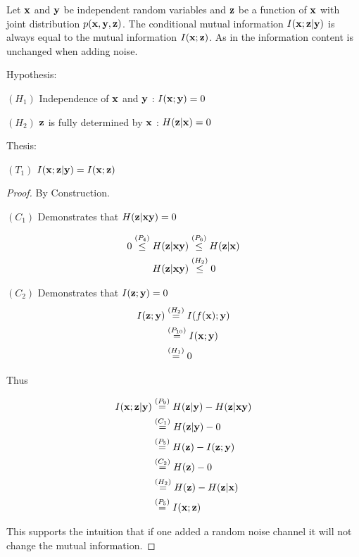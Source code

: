 \begin{lemma}
Let ${\mathbf{x}}$ and ${\mathbf{y}}$ be independent random variables and ${\mathbf{z}}$ be a function of ${\mathbf{x}}$ with joint distribution $p({\mathbf{x}}, {\mathbf{y}}, {\mathbf{z}})$. The conditional mutual information $I({\mathbf{x}}; {\mathbf{z}}| {\mathbf{y}})$ is always equal to the mutual information $I({\mathbf{x}}; {\mathbf{z}})$. As in the information content is unchanged when adding noise. 

Hypothesis:

$(H_1)$ Independence of ${\mathbf{x}}$ and ${\mathbf{y}}$ : $I({\mathbf{x}};{\mathbf{y}}) = 0$

$(H_2)$  ${\mathbf{z}}$ is fully determined by ${\mathbf{x}}$ : $H({\mathbf{z}}|{\mathbf{x}}) = 0$

Thesis: 

$(T_1)$ $I({\mathbf{x}}; {\mathbf{z}}| {\mathbf{y}}) = I({\mathbf{x}}; {\mathbf{z}})$ 

\begin{proof}
    By Construction. 

    $(C_1)$ Demonstrates that $H({\mathbf{z}}| {\mathbf{x}} {\mathbf{y}}) = 0$

    $$
\begin{aligned}
0 \stackrel{\left(P_4\right)}{\leq} H({\mathbf{z}}|{\mathbf{x}} {\mathbf{y}})&\stackrel{\left(P_6\right)}{\leq}H({\mathbf{z}}|{\mathbf{x}})\\
H({\mathbf{z}}|{\mathbf{x}} {\mathbf{y}})&\stackrel{\left(H_2\right)}{\leq} 0
\end{aligned}
$$

    $(C_2)$ Demonstrates that $I({\mathbf{z}};{\mathbf{y}}) = 0$ 
    $$
\begin{aligned}
I({\mathbf{z}}; {\mathbf{y}})&\stackrel{\left(H_2\right)}{=}I(f({\mathbf{x}});{\mathbf{y}})\\
&\stackrel{\left(P_{10}\right)}{=}I({\mathbf{x}} ; {\mathbf{y}})\\
&\stackrel{\left(H_{1}\right)}{=}0\\
\end{aligned}
$$
    
    
Thus 

    $$
\begin{aligned}
I({\mathbf{x}}; {\mathbf{z}}| {\mathbf{y}}) &\stackrel{\left(P_9\right)}{=} H({\mathbf{z}}|{\mathbf{y}}) - H({\mathbf{z}}|{\mathbf{x}} {\mathbf{y}})\\
&\stackrel{\left(C_1\right)}{=} H({\mathbf{z}}| {\mathbf{y}})- 0\\
&\stackrel{\left(P_5\right)}{=} H({\mathbf{z}}) - I({\mathbf{z}}; {\mathbf{y}}) \\
&\stackrel{\left(C_2\right)}{=}H({\mathbf{z}}) - 0 \\
&\stackrel{\left(H_2\right)}{=}H({\mathbf{z}}) - H({\mathbf{z}}| {\mathbf{x}}) \\
&\stackrel{\left(P_5\right)}{=}I({\mathbf{x}}; {\mathbf{z}})
\end{aligned}
$$
    
This supports the intuition that if one added a random noise channel it will not change the mutual information.

\end{proof}
\label{app:domain_infonoise}
\end{lemma}

